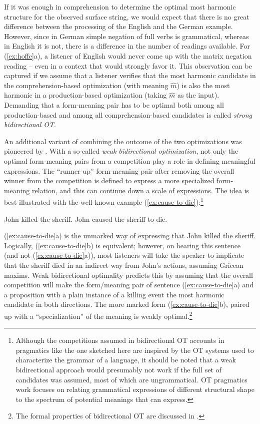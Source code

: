 \documentclass[output=paper,hidelinks]{langscibook}
\begin{document}
\noindent If it was enough in comprehension to determine the optimal most harmonic structure for the observed surface string, we would expect that there is no great difference between the processing of the English and the German example.  However, since in German simple negation of full verbs is grammatical, whereas in English it is not, there is a difference in the number of readings available.  For (\ref{ex:hoffe}a), a listener of English would never come up with the matrix negation reading -- even in a context that would strongly favor it.  This observation can be captured if we assume that a listener verifies that the most harmonic candidate in the comprehension-based optimization (with meaning $\hat{m}$) is also the most harmonic in a production-based optimization (taking $\hat{m}$ as the input).
Demanding that a form-meaning pair has to be optimal both among all production-based and among all comprehension-based candidates is called \emph{strong bidirectional OT}. 

An additional variant of combining the outcome of the two optimizations was pioneered by \citet{Blutner98,Blutner00}. With a so-called \emph{weak bidirectional optimization}, not only the optimal form-meaning pairs from a competition play a role in defining meaningful expressions. The ``runner-up'' form-meaning pair after removing the overall winner from the competition is defined to express a more specialized form-meaning relation, and this can continue down a scale of expressions. The idea is best illustrated with the well-known example (\ref{ex:cause-to-die}):\footnote{Although the competitions assumed in bidirectional OT accounts in pragmatics like the one sketched here are inspired by the OT systems used to characterize the grammar of a language, it should be noted that a weak bidirectional approach would presumably not work if the full set of candidates was assumed, most of which are ungrammatical. OT pragmatics work focuses on relating grammatical expressions of different structural shape to the spectrum of potential meanings that can express.}

\largerpage
\ea \label{ex:cause-to-die}
  \ea John killed the sheriff.
  \ex John caused the sheriff to die.
  \z
\z

\noindent
(\ref{ex:cause-to-die}a) is the unmarked way of expressing that John killed the sheriff. Logically, (\ref{ex:cause-to-die}b) is equivalent; however, on hearing this sentence (and not (\ref{ex:cause-to-die}a)), most listeners will take the speaker to implicate that the sheriff died in an indirect way from John's actions, assuming Gricean maxims. 
Weak bidirectional optimality predicts this by assuming that the overall competition will make the form/meaning pair of sentence (\ref{ex:cause-to-die}a) and a proposition with a plain instance of a killing event the most harmonic candidate in both directions. The more marked form (\ref{ex:cause-to-die}b), paired up with a ``specialization'' of the meaning is weakly optimal.\footnote{The formal properties of bidirectional OT are discussed in \citet{Jaeger2002}.}
\end{document}

